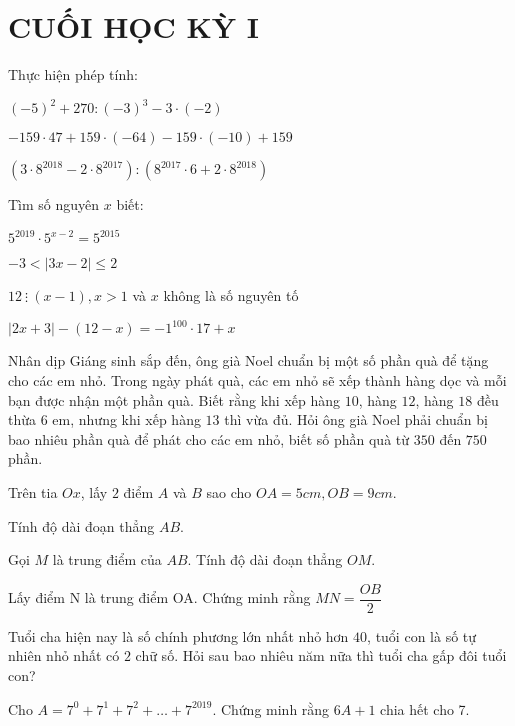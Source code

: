 \section{CUỐI HỌC KỲ I}
\setcounter{ex}{0}
\begin{ex}
	Thực hiện phép tính:
	\begin{listEX}
	\item $(-5)^{2}+270:(-3)^{3}-3 \cdot(-2)$
	\item $-159 \cdot 47+159 \cdot(-64)-159 \cdot(-10)+159$  
	\item $\left(3 \cdot 8^{2018}-2 \cdot 8^{2017}\right):\left(8^{2017} \cdot 6+2 \cdot 8^{2018}\right)$
	\end{listEX}
\end{ex}
\begin{ex}
	Tìm số nguyên $x$ biết:
	\begin{listEX}[2]
	\item $5^{2019} \cdot 5^{x-2}=5^{2015}$
	\item $-3<|3 x-2| \leq 2$
	\item $12~\vdots~(x-1), x>1$ và $x$ không là số nguyên tố
	\item $|2 x+3|-(12-x)=-1^{100} \cdot 17+x$
	\end{listEX}
\end{ex}
\begin{ex}
	Nhân dịp Giáng sinh sắp đến, ông già Noel chuẩn bị một số phần quà để tặng cho các em nhỏ. Trong ngày phát quà, các em nhỏ sẽ xếp thành hàng dọc và mỗi bạn được nhận một phần quà. Biết rằng khi xếp hàng $10$, hàng $12$, hàng $18$ đều thừa $6$ em, nhưng khi xếp hàng $13$ thì vừa đủ. Hỏi ông già Noel phải chuẩn bị bao nhiêu phần quà để phát cho các em nhỏ, biết số phần quà từ $350$ đến $750$ phần.
\end{ex}
\begin{ex}
	Trên tia $Ox$, lấy $2$ điểm $A$ và $B$ sao cho $OA = 5cm, OB = 9cm$.
		\begin{listEX}
			\item Tính độ dài đoạn thẳng $AB$.
	\item Gọi $M$ là trung điểm của $AB$. Tính độ dài đoạn thẳng $OM$.
	\item Lấy điểm N là trung điểm OA. Chứng minh rằng $M N=\dfrac{O B}{2}$
		\end{listEX}
\end{ex}
\begin{ex}
	Tuổi cha hiện nay là số chính phương lớn nhất nhỏ hơn $40$, tuổi con là số tự nhiên nhỏ nhất có $2$ chữ số. Hỏi sau bao nhiêu năm nữa thì tuổi cha gấp đôi tuổi con?
\end{ex}
\begin{ex}
	Cho $A=7^{0}+7^{1}+7^{2}+\ldots+7^{2019}$. Chứng minh rằng $6 A+1$ chia hết cho 7.

\end{ex}